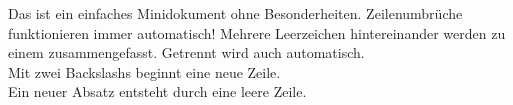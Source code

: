 \documentclass[a4paper, pdftex, ngerman]{article}
\begin{document}
Das ist ein einfaches Minidokument
ohne Besonderheiten. Zeilenumbrüche
funktionieren immer automatisch!
Mehrere
Leerzeichen hintereinander werden 
zu einem zusammengefasst.
Getrennt wird auch automatisch.\\
Mit zwei Backslashs beginnt eine neue
Zeile.\\
Ein neuer Absatz entsteht durch eine
leere Zeile.
\end{document}
